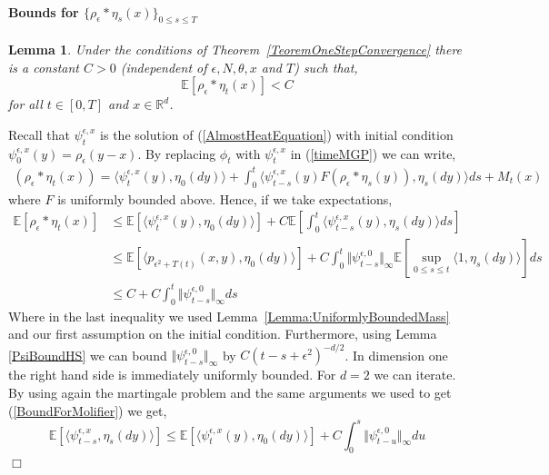\documentclass[12pt]{article}
\newenvironment {proof}{{\noindent\bf Proof }}{\hfill $\Box$ \medskip}
\newtheorem{lemma}[theorem]{Lemma}
\newcommand{\IE}{\mathbb E}
\newcommand{\IR}{\mathbb R}
\begin{document}
\paragraph{Bounds for $\{ \rho_\epsilon * \eta_s (x)\}_{0 \leq s \leq T}$}
\begin{lemma} \label{FirstBoundLocalDensity}
Under the conditions of Theorem~\ref{TeoremOneStepConvergence} there is a constant $C>0$ (independent of $\epsilon, N, \theta, x$ and $T$) such that,
\[ \IE[ \rho_\epsilon*\eta_t(x) ] < C \]
for all $t \in [0,T]$ and $x \in \IR^d$.
\end{lemma}
\begin{proof}
Recall that $\psi_t^{\epsilon,x}$ is the solution of (\ref{AlmostHeatEquation}) with initial condition $\psi_0^{\epsilon,x}(y)=\rho_\epsilon(y-x)$. By replacing $\phi_t$ with $\psi_t^{\epsilon,x}$ in (\ref{timeMGP}) we can write,
\begin{align}
(\rho_\epsilon*\eta_t(x)) = \langle \psi_t^{\epsilon,x}(y), \eta_0(dy) \rangle  + \int_0^t \langle \psi_{t-s}^{\epsilon,x}(y) F(\rho_\epsilon*\eta_s(y)), \eta_s(dy) \rangle ds + M_t(x) \label{MartingaleProblemMolifier}
\end{align}
where $F$ is uniformly bounded above. Hence, if we take expectations,
\begin{align}
\IE[\rho_\epsilon * \eta_t(x)]
    &\le
    \IE[\langle \psi_t^{\epsilon,x}(y), \eta_0(dy) \rangle] + C \IE[\int_0^t \langle \psi_{t-s}^{\epsilon,x}(y), \eta_s(dy) \rangle ds] \nonumber \\ & \leq  \IE[\langle p_{\epsilon^2+T(t)}(x,y),\eta_0(dy)\rangle] + C \int_0^t \Vert \psi_{t-s}^{\epsilon,0} \Vert_\infty \IE[\sup_{0 \leq s \leq t} \langle 1, \eta_s(dy) \rangle] ds \\ & \leq C + C \int_0^t \Vert \psi_{t-s}^{\epsilon,0} \Vert_\infty ds \label{BoundForMolifier}
\end{align}
Where in the last inequality we used Lemma~\ref{Lemma:UniformlyBoundedMass} and our first assumption on the initial condition. Furthermore, using Lemma \ref{PsiBoundHS} we can bound $\Vert \psi_{t-s}^{\epsilon,0} \Vert_\infty$ by $C (t-s+\epsilon^2)^{-d/2}$. In dimension one the right hand side is immediately uniformly bounded. For $d=2$ we can iterate. By using again the martingale problem and the same arguments we used to get (\ref{BoundForMolifier}) we get,
\begin{equation} \label{IterationBoundPsi}
\IE[\langle \psi_{t-s}^{\epsilon,x}, \eta_s(dy)\rangle] \leq \IE[\langle \psi_{t}^{\epsilon,x}(y), \eta_0(dy) \rangle]  + C \int_0^s \Vert \psi_{t-u}^{\epsilon,0} \Vert_\infty du

\end{equation}
\end{proof}
\end{document}
